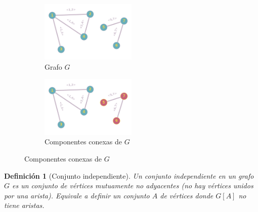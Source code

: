 \documentclass[a4paper,1pt]{report}
\newtheorem*{dfn}{Definición}
\begin{document}
\begin{figure}[H]
    \centering
    \begin{subfigure}[b]{0.45\textwidth}
    \centering
    \includegraphics[width=0.5\textwidth]{figures/noConexo.png}
    \caption{Grafo $G$}
    \end{subfigure}
    \begin{subfigure}[b]{0.45\textwidth}
        \centering
    \includegraphics[width=0.5\textwidth]{figures/componentes.png}
    \caption{Componentes conexas de $G$}
    \end{subfigure}
\end{figure} 

\begin{dfn}[Conjunto independiente]
    Un conjunto independiente en un grafo $G$ es un conjunto de vértices
mutuamente no adyacentes (no hay vértices unidos por una arista). Equivale a definir un conjunto $A$ de
vértices donde $G[A]$ no tiene aristas.
\end{dfn}
\end{document}
